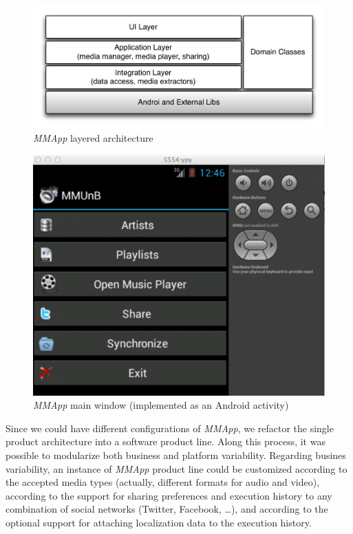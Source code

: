 \documentclass{article}
\newcommand{\mapp}{\emph{MMApp}}
\begin{document}
\begin{figure}[htb]
  \begin{center}
    \includegraphics[scale=0.7]{images/architecture.pdf}
  \end{center}
  \caption{\mapp{} layered architecture}
  \label{fig:architecture}
\end{figure} 


\begin{figure}[htb]
  \begin{center}
    \includegraphics[scale=0.4]{images/ui.pdf}
  \end{center}
  \caption{\mapp{} main window (implemented as an Android activity)}
  \label{fig:ui}
\end{figure} 

Since we could have different configurations of \mapp{}, we 
refactor the single product architecture into a software product
line. Along this process, it was possible to modularize 
both business and platform variability.   
Regarding busines variability, an instance of \mapp{} product line
could be customized according to the accepted media types (actually,
different formats for audio and video), according to the support for
sharing preferences and execution history to any combination of 
social networks (Twitter, Facebook, \ldots), and according to the 
optional support for attaching localization data to the execution
history. 
\end{document}
